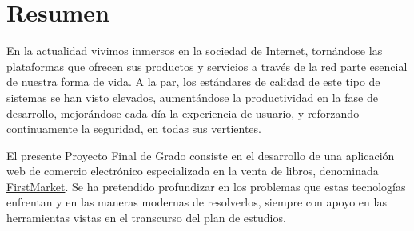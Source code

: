 \documentclass[a4paper,12pt,twoside,openright]{report}
\begin{document}
   
   \section*{Resumen}
   \thispagestyle{empty}
   En la actualidad vivimos inmersos en la sociedad de Internet, tornándose las plataformas que ofrecen sus productos y servicios a través de la red parte esencial de nuestra forma de vida. A la par, los estándares de calidad de este tipo de sistemas se han visto elevados, aumentándose la productividad en la fase de desarrollo, mejorándose cada día la experiencia de usuario, y reforzando continuamente la seguridad, en todas sus vertientes.
   
   El presente Proyecto Final de Grado consiste en el desarrollo de una aplicación web de comercio electrónico especializada en la venta de libros, denominada \href{https://firstmarket.tech}{FirstMarket}. Se ha pretendido profundizar en los problemas que estas tecnologías enfrentan y en las maneras modernas de resolverlos, siempre con apoyo en las herramientas vistas en el transcurso del plan de estudios.
   
\end{document}
